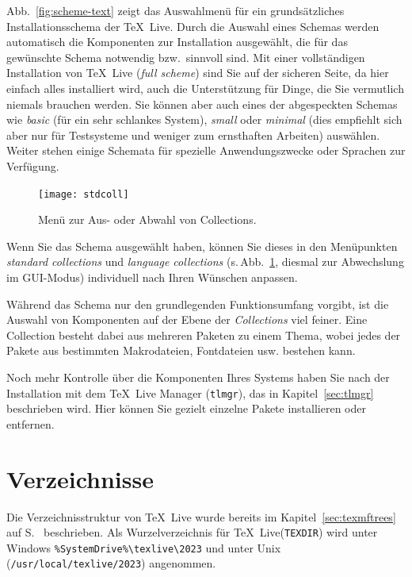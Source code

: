 \documentclass[12pt,ngerman,a4paper,fullparskip]{scrreprt}
\newcommand{\TL}{\TeX\ Live\xspace}
\newcommand{\prog}[1]{\texttt{#1}}
\newcommand{\dirname}[1]{\texttt{#1}}
\begin{document}
\noindent Abb.~\ref{fig:scheme-text} zeigt das Auswahlmenü für ein grundsätzliches Installationsschema der
\TL. Durch die Auswahl eines Schemas werden automatisch die Komponenten zur Installation ausgewählt, die
für das gewünschte Schema notwendig bzw.\ sinnvoll sind. Mit einer vollständigen Installation von \TL
(\emph{full scheme}) sind Sie auf der sicheren Seite, da hier einfach alles installiert wird, auch die Unterstützung für Dinge, die Sie vermutlich niemals brauchen werden. Sie können aber auch eines der abgespeckten Schemas wie \emph{basic} (für ein sehr schlankes System), \emph{small}
oder \emph{minimal} (dies empfiehlt sich aber nur für Testsysteme und weniger zum ernsthaften Arbeiten)
auswählen. Weiter stehen einige Schemata für spezielle Anwendungszwecke oder Sprachen zur Verfügung.

\begin{figure}[tb]
\begin{center}
\texttt{[image: stdcoll]}
\caption{Menü zur Aus- oder Abwahl von Collections.}\label{fig:collections-gui}
\end{center}
\end{figure}

Wenn Sie das Schema ausgewählt haben, können Sie dieses in den Menüpunkten \emph{standard collections} und
\emph{language collections} (s.\,Abb.~\ref{fig:collections-gui}, diesmal zur Abwechslung im GUI-Modus)
individuell nach Ihren Wünschen anpassen.

Während das Schema nur den grundlegenden Funktionsumfang vorgibt, ist die Auswahl von Komponenten auf der
Ebene der \emph{Collections} viel feiner. Eine Collection besteht dabei aus mehreren Paketen zu einem Thema,
wobei jedes der Pakete aus bestimmten Makrodateien, Fontdateien usw. bestehen kann.

Noch mehr Kontrolle über die Komponenten Ihres Systems haben Sie nach der Installation mit dem \TeX\ Live Manager (\prog{tlmgr}), das in Kapitel~\ref{sec:tlmgr} beschrieben wird. Hier können Sie gezielt einzelne Pakete installieren oder entfernen.

\section{Verzeichnisse}\label{sec:directories}


Die Verzeichnisstruktur von \TL wurde bereits im Kapitel~\ref{sec:texmftrees} auf S.~\pageref{sec:texmftrees}
beschrieben. Als Wurzelverzeichnis für \TL (\dirname{TEXDIR}) wird unter Windows
\verb|%SystemDrive%\texlive\2023| und unter Unix (\dirname{/usr/local/texlive/2023}) angenommen. 
\end{document}
